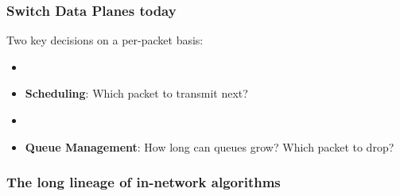 \begin{Large}
\begin{frame}[plain]
\frametitle{Switch Data Planes today}
Two key decisions on a per-packet basis:
\begin{itemize}
\item[]
\item {\bf Scheduling}: Which packet to transmit next?
\item[]
\item {\bf Queue Management}: How long can queues grow? Which packet to drop?
\end{itemize}
\end{frame}

\begin{frame}[plain]
\frametitle{The long lineage of in-network algorithms}

\end{frame}
\end{Large}
